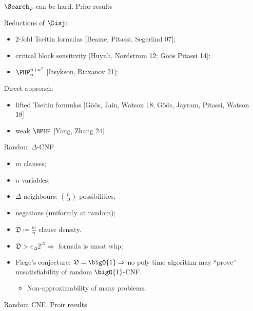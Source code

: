 \begin{frame}{$\Search_{\varphi}$ can be hard. Prior results}

    Reductions of $\Disj$:
    \begin{itemize}
        \item $2$-fold Tseitin formulas [Beame, Pitassi, Segerlind
            07];
        \item critical block sensitivity [Huynh, Nordstrom 12;
            G{\"{o}}{\"{o}}s Pitassi 14];
            \pause
        \item $\PHP^{n + n^{\varepsilon}}_{n}$ [Itsykson, Riazanov 21];
    \end{itemize}

    \pause
    \vspace{0.5cm}
    Direct approach:
    \begin{itemize}
        \item lifted Tseitin formulas [G{\"{o}}{\"{o}}s, Jain, Watson
            18; G{\"{o}}{\"{o}}s, Jayram, Pitassi, Watson 18]
        \item weak $\BPHP$ [Yang, Zhang 24].
    \end{itemize}
\end{frame}


\begin{frame}{Random $\Delta$-CNF}

    \begin{minipage}{0.38\linewidth}
        \centering
        
    \end{minipage}
    \begin{minipage}{0.58\linewidth}
        \begin{itemize}
            \item $m$ clauses;
            \item $n$ variables;
            \item $\Delta$ neighbours: $\binom{n}{\Delta}$ possibilities;
            \item negations (uniformly at random);
            \item $\mathfrak{D} \coloneqq \frac{m}{n}$ clause density.
        \end{itemize}
    \end{minipage}

    \pause
    \begin{itemize}
        \item $\mathfrak{D} > c_{\Delta} 2^{\Delta} \Rightarrow$ formula is unsat whp;
            \pause
        \item Fiege's conjecture: $\mathfrak{D} = \bigO{1} \Rightarrow$ no poly-time algorithm may
            ``prove'' unsatisfiability of random $\bigO{1}$-CNF.
            \begin{itemize}
                \item Non-approximability of many problems.
            \end{itemize}
    \end{itemize}

\end{frame}


\begin{frame}{Random CNF. Proir results}

    \begin{center}
        
    \end{center}
\end{frame}